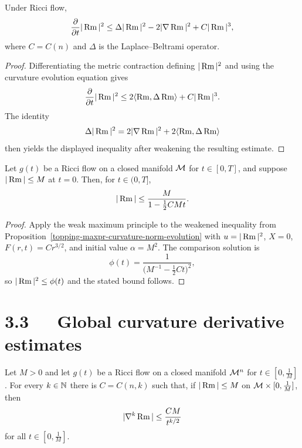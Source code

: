 \begin{proposition}
\label{topping-maxpr-curvature-norm-evolution}
Under Ricci flow,
\[
\frac{\partial}{\partial t}|\operatorname{Rm}|^2
\leq\Delta|\operatorname{Rm}|^2-2|\nabla\operatorname{Rm}|^2+C|\operatorname{Rm}|^3,
\]
where $C=C(n)$ and $\Delta$ is the Laplace--Beltrami operator.
\end{proposition}

\begin{proof}
\sketch Differentiating the metric contraction defining $|\operatorname{Rm}|^2$ and using
the curvature evolution equation gives
\[
\frac{\partial}{\partial t}|\operatorname{Rm}|^2
\leq2\langle\operatorname{Rm},\Delta\operatorname{Rm}\rangle+C|\operatorname{Rm}|^3.
\]
The identity
\[
\Delta|\operatorname{Rm}|^2=2|\nabla\operatorname{Rm}|^2+2\langle\operatorname{Rm},\Delta\operatorname{Rm}\rangle
\]
then yields the displayed inequality after weakening the resulting estimate.
\end{proof}

\begin{theorem}
\label{topping-maxpr-curvature-norm-bound}
Let $g(t)$ be a Ricci flow on a closed manifold $\mathcal{M}$ for $t\in[0,T]$, and
suppose $|\operatorname{Rm}|\leq M$ at $t=0$. Then, for $t\in(0,T]$,
\[
|\operatorname{Rm}|\leq\frac{M}{1-\frac12CMt}.
\]
\end{theorem}

\begin{proof}
\sketch Apply the weak maximum principle to the weakened inequality from
Proposition~\ref{topping-maxpr-curvature-norm-evolution} with $u=|\operatorname{Rm}|^2$, $X=0$, $F(r,t)=Cr^{3/2}$, and initial
value $\alpha=M^2$. The comparison solution is
\[
\phi(t)=\frac{1}{\bigl(M^{-1}-\frac12Ct\bigr)^2},
\]
so $|\operatorname{Rm}|^2\leq\phi(t)$ and the stated bound follows.
\end{proof}

\section*{3.3\ \ \ Global curvature derivative estimates}

\begin{theorem}
\label{topping-maxpr-first-derivative-estimate}
Let $M>0$ and let $g(t)$ be a Ricci flow on a closed manifold $\mathcal{M}^n$ for
$t\in[0,\frac1M]$. For every $k\in\mathbb{N}$ there is $C=C(n,k)$ such that, if
$|\operatorname{Rm}|\leq M$ on $\mathcal{M}\times[0,\frac1M]$, then
\[
|\nabla^k\operatorname{Rm}|\leq\frac{CM}{t^{k/2}}
\]
for all $t\in[0,\frac1M]$.
\end{theorem}

